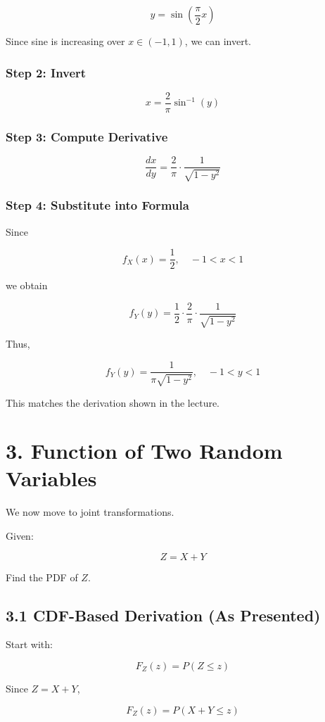 \documentclass[12pt]{article}
\begin{document}
\[
y = \sin\left(\frac{\pi}{2} x \right)
\]

Since sine is increasing over $x \in (-1,1)$, we can invert.

\subsubsection*{Step 2: Invert}

\[
x = \frac{2}{\pi} \sin^{-1}(y)
\]

\subsubsection*{Step 3: Compute Derivative}

\[
\frac{dx}{dy}
=
\frac{2}{\pi} \cdot \frac{1}{\sqrt{1-y^2}}
\]

\subsubsection*{Step 4: Substitute into Formula}

Since

\[
f_X(x) = \frac{1}{2}, \quad -1 < x < 1
\]

we obtain

\[
f_Y(y)
=
\frac{1}{2}
\cdot
\frac{2}{\pi}
\cdot
\frac{1}{\sqrt{1-y^2}}
\]

Thus,

\[
\boxed{
f_Y(y) = \frac{1}{\pi \sqrt{1-y^2}}, \quad -1 < y < 1
}
\]

This matches the derivation shown in the lecture.

\section*{3. Function of Two Random Variables}

We now move to joint transformations.

Given:

\[
Z = X + Y
\]

Find the PDF of $Z$.

\subsection*{3.1 CDF-Based Derivation (As Presented)}

Start with:

\[
F_Z(z) = P(Z \le z)
\]

Since $Z = X + Y$,

\[
F_Z(z) = P(X + Y \le z)
\]
\end{document}
